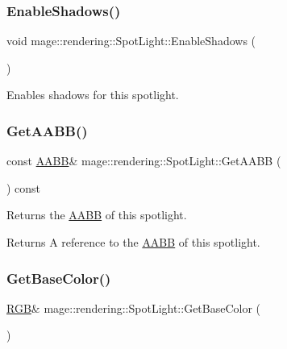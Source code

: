 \subsubsection{\texorpdfstring{Enable\+Shadows()}{EnableShadows()}}
{\footnotesize\ttfamily void mage\+::rendering\+::\+Spot\+Light\+::\+Enable\+Shadows (\begin{DoxyParamCaption}{ }\end{DoxyParamCaption})\hspace{0.3cm}{\ttfamily [noexcept]}}

Enables shadows for this spotlight. \mbox{\label{classmage_1_1rendering_1_1_spot_light_a09e58c11a2f81de811c4d8e51c5d13c3}} 
\subsubsection{\texorpdfstring{Get\+A\+A\+B\+B()}{GetAABB()}}
{\footnotesize\ttfamily const \mbox{\hyperlink{classmage_1_1_a_a_b_b}{A\+A\+BB}}\& mage\+::rendering\+::\+Spot\+Light\+::\+Get\+A\+A\+BB (\begin{DoxyParamCaption}{ }\end{DoxyParamCaption}) const\hspace{0.3cm}{\ttfamily [noexcept]}}

Returns the \mbox{\hyperlink{classmage_1_1_a_a_b_b}{A\+A\+BB}} of this spotlight.

\begin{DoxyReturn}{Returns}
A reference to the \mbox{\hyperlink{classmage_1_1_a_a_b_b}{A\+A\+BB}} of this spotlight. 
\end{DoxyReturn}
\mbox{\label{classmage_1_1rendering_1_1_spot_light_ac86581dd4af14206c11470beec10fe02}} 
\subsubsection{\texorpdfstring{Get\+Base\+Color()}{GetBaseColor()}\hspace{0.1cm}{\footnotesize\ttfamily [1/2]}}
{\footnotesize\ttfamily \mbox{\hyperlink{structmage_1_1_r_g_b}{R\+GB}}\& mage\+::rendering\+::\+Spot\+Light\+::\+Get\+Base\+Color (\begin{DoxyParamCaption}{ }\end{DoxyParamCaption})\hspace{0.3cm}{\ttfamily [noexcept]}}

